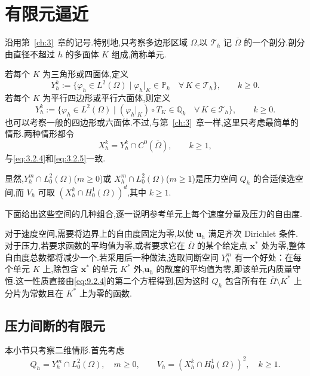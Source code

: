 \section{有限元逼近}\label{sec:9.3}

沿用第~\ref{ch:3}~章的记号.特别地,只考察多边形区域 \(\Omega\),以 \(\mathcal T_h\) 记 \(\overline\Omega\) 的一个剖分.剖分由直径不超过 \(h\) 的多面体 \(K\) 组成,简称单元.

若每个 \(K\) 为三角形或四面体,定义
\begin{equation}\label{eq:9.3.1}
  Y_h^k:=\{\varphi_h\in L^2(\Omega)\mid
    \varphi_h|_K\in\mathbb P_k\quad\forall\,K\in\mathcal T_h\},\qquad k\ge0.
\end{equation}
若每个 \(K\) 为平行四边形或平行六面体,则定义
\begin{equation}\label{eq:9.3.2}
  Y_h^k:=\{\varphi_h\in L^2(\Omega)\mid
    (\varphi_h|_K)\circ T_K\in\mathbb Q_k\quad\forall\,K\in\mathcal T_h\},\qquad k\ge0.
\end{equation}
也可以考察一般的四边形或六面体.不过,与第~\ref{ch:3}~章一样,这里只考虑最简单的情形.两种情形都令
\begin{equation}\label{eq:9.3.3}
  X_h^k=Y_h^k\cap C^0(\overline\Omega),\qquad k\ge1,
\end{equation}
与\eqref{eq:3.2.4}和\eqref{eq:3.2.5}一致.

显然,\(Y_h^m\cap L_0^2(\Omega)\)(\(m\ge0\))或 \(X_h^m\cap L_0^2(\Omega)\)(\(m\ge1\))是压力空间 \(Q_h\) 的合适候选空间,而 \(V_h\) 可取 \((X_h^k\cap H_0^1(\Omega))^d\),其中 \(k\ge1\).

下面给出这些空间的几种组合,逐一说明参考单元上每个速度分量及压力的自由度.

对于速度空间,需要将边界上的自由度固定为零,以使 \(\boldsymbol{u}_h\) 满足齐次 Dirichlet 条件.对于压力,若要求函数的平均值为零,或者要求它在 \(\overline\Omega\) 的某个给定点 \(\boldsymbol{x}^*\) 处为零,整体自由度总数都将减少一个.若采用后一种做法,选取间断空间 \(Y_h^m\) 有一个好处：在每个单元 \(K\) 上,除包含 \(\boldsymbol{x}^*\) 的单元 \(K^*\) 外,\(\boldsymbol{u}_h\) 的散度的平均值为零,即该单元内质量守恒.这一性质直接由\eqref{eq:9.2.4}的第二个方程得到,因为这时 \(Q_h\) 包含所有在 \(\overline\Omega\setminus K^*\) 上分片为常数且在 \(K^*\) 上为零的函数.

\subsection{压力间断的有限元}\label{sec:9.3.1}

本小节只考察二维情形.首先考虑
\begin{equation}\label{eq:9.3.4}
  Q_h=Y_h^m\cap L_0^2(\Omega),\quad m\ge0,\qquad
  V_h=(X_h^k\cap H_0^1(\Omega))^2,\quad k\ge1.
\end{equation}

